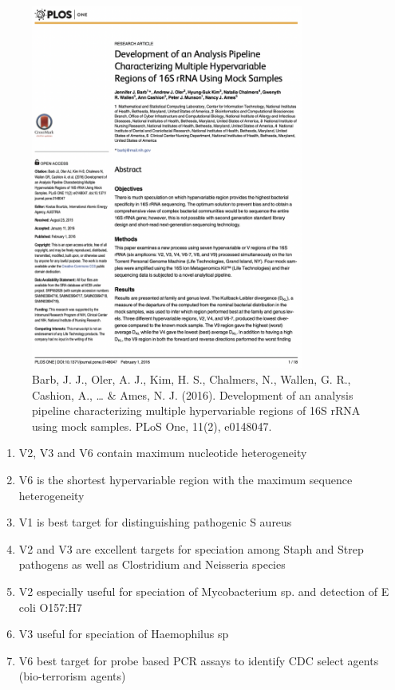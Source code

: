 \documentclass[
]{book}
\providecommand{\tightlist}{%
  \setlength{\itemsep}{0pt}\setlength{\parskip}{0pt}}
\begin{document}
\begin{figure}
\centering
\includegraphics[width=0.8\textwidth,height=\textheight]{./Figures/Plos1.png}
\caption{Barb, J. J., Oler, A. J., Kim, H. S., Chalmers, N., Wallen, G. R., Cashion, A., \ldots{} \& Ames, N. J. (2016). Development of an analysis pipeline characterizing multiple hypervariable regions of 16S rRNA using mock samples. PLoS One, 11(2), e0148047.}
\end{figure}

\begin{enumerate}
\def\labelenumi{\arabic{enumi}.}
\tightlist
\item
  V2, V3 and V6 contain maximum nucleotide heterogeneity
\item
  V6 is the shortest hypervariable region
  with the maximum sequence
  heterogeneity
\item
  V1 is best target for distinguishing
  pathogenic S aureus
\item
  V2 and V3 are excellent targets for
  speciation among Staph and Strep pathogens as well as Clostridium and Neisseria species
\item
  V2 especially useful for speciation of Mycobacterium sp. and detection of E coli O157:H7
\item
  V3 useful for speciation of
  Haemophilus sp
\item
  V6 best target for probe based PCR assays to identify CDC select agents (bio-terrorism agents)
\end{enumerate}
\end{document}
